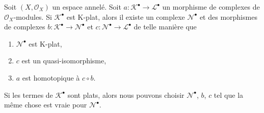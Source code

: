 \begin{lemma}

\label{lemma-factor-through-K-flat}

Soit $(X, \mathcal{O}_X)$ un espace annelé. Soit $a : \mathcal{K}^\bullet \to \mathcal{L}^\bullet$ un morphisme de complexes de $\mathcal{O}_X$-modules. Si $\mathcal{K}^\bullet$ est K-plat, alors il existe un complexe $\mathcal{N}^\bullet$ et des morphismes de complexes
$b : \mathcal{K}^\bullet \to \mathcal{N}^\bullet$
et $c : \mathcal{N}^\bullet \to \mathcal{L}^\bullet$ de telle manière que

\begin{enumerate}

\item  $\mathcal{N}^\bullet$ est K-plat,
\item  $c$ est un quasi-isomorphisme,
\item  $a$ est homotopique à $c \circ b$.

\end{enumerate}

Si les termes de $\mathcal{K}^\bullet$ sont plats, alors nous pouvons choisir
$\mathcal{N}^\bullet$, $b$, $c$
tel que la même chose est vraie pour $\mathcal{N}^\bullet$.

\end{lemma}

